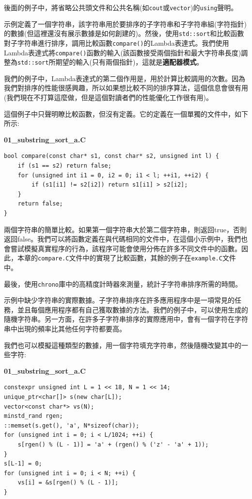 後面的例子中，將省略公共頭文件和公共名稱(如\texttt{cout}或\texttt{vector})的\texttt{using}聲明。

示例定義了一個字符串，該字符串用於要排序的子字符串和子字符串組(字符指針)的數據(但這裡還沒有展示數據是如何創建的)。然後，使用\texttt{std::sort}和比較函數對子字符串進行排序，調用比較函數\texttt{compare()}的Lambda表達式。我們使用Lambda表達式將\texttt{compare()}函數的輸入(該函數接受兩個指針和最大字符串長度)調整為\texttt{std::sort}所期望的輸入(只有兩個指針)，這就是\textbf{適配器模式}。

我們的例子中，Lambda表達式的第二個作用是，用於計算比較調用的次數。因為我們對排序的性能很感興趣，所以如果想比較不同的排序算法，這個信息會很有用(我們現在不打算這麼做，但是這個對讀者們的性能優化工作很有用)。

這個例子中只聲明瞭比較函數，但沒有定義。它的定義在一個單獨的文件中，如下所示:


\noindent
\textbf{01\_substring\_sort\_a.C}
\begin{lstlisting}[style=styleCXX]
bool compare(const char* s1, const char* s2, unsigned int l) {
	if (s1 == s2) return false;
	for (unsigned int i1 = 0, i2 = 0; i1 < l; ++i1, ++i2) {
		if (s1[i1] != s2[i2]) return s1[i1] > s2[i2];
	}
	return false;
}
\end{lstlisting}

兩個字符串的簡單比較。如果第一個字符串大於第二個字符串，則返回true，否則返回false。我們可以將函數定義在與代碼相同的文件中，在這個小示例中，我們也會嘗試模擬真實程序的行為，該程序可能會使用分佈在許多不同文件中的函數。因此，本章的\texttt{compare.C}文件中的實現了比較函數，其餘的例子在\texttt{example.C}文件中。

最後，使用\texttt{chrono}庫中的高精度計時器來測量，統計子字符串排序所需的時間。

示例中缺少字符串的實際數據。子字符串排序在許多應用程序中是一項常見的任務，並且每個應用程序都有自己獲取數據的方法。我們的例子中，可以使用生成的隨機字符串。另一方面，在許多子字符串排序的實際應用中，會有一個字符在字符串中出現的頻率比其他任何字符都要高。

我們也可以模擬這種類型的數據，用一個字符填充字符串，然後隨機改變其中的一些字符:

\noindent
\textbf{01\_substring\_sort\_a.C}
\begin{lstlisting}[style=styleCXX]
constexpr unsigned int L = 1 << 18, N = 1 << 14;
unique_ptr<char[]> s(new char[L]);
vector<const char*> vs(N);
minstd_rand rgen;
::memset(s.get(), 'a', N*sizeof(char));
for (unsigned int i = 0; i < L/1024; ++i) {
	s[rgen() % (L - 1)] = 'a' + (rgen() % ('z' - 'a' + 1));
}
s[L-1] = 0;
for (unsigned int i = 0; i < N; ++i) {
	vs[i] = &s[rgen() % (L - 1)];
}
\end{lstlisting}

